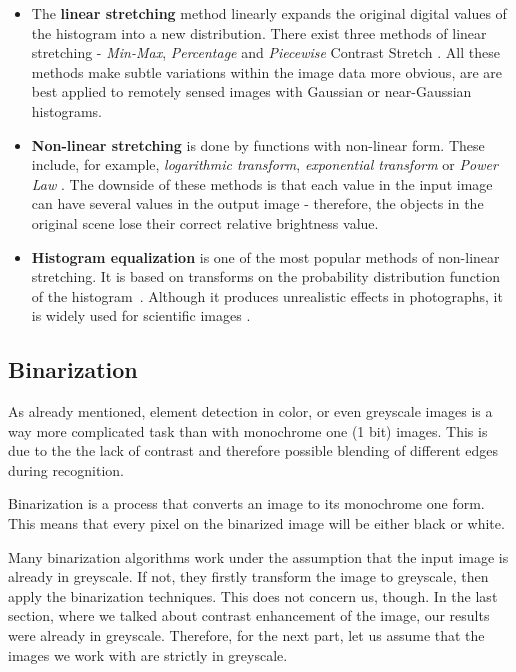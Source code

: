 \begin{itemize}

\item The \textbf{linear stretching} method linearly expands the original digital values of the histogram into a new distribution. There exist three methods of linear stretching - \emph{Min-Max}, \emph{Percentage} and \emph{Piecewise} Contrast Stretch \citet{linearNonStretch}. All these methods make subtle variations within the image data more obvious, are are best applied to remotely sensed images with Gaussian or near-Gaussian histograms.

\item\textbf{Non-linear stretching} is done by functions with non-linear form. These include, for example, \emph{logarithmic transform}, \emph{exponential transform} or \emph{Power Law} \citep{linearNonStretch}. The downside of these methods is that each value in the input image can have several values in the output image - therefore, the objects in the original scene lose their correct relative brightness value.

\item\textbf{Histogram equalization} is one of the most popular methods of non-linear stretching. It is based on transforms   on the probability distribution function of the histogram~\citep{histogramEQ}. Although it produces unrealistic effects in photographs, it is widely used for scientific images .

\end{itemize}

\subsection{Binarization}

As already mentioned, element detection in color, or even greyscale images is a way more complicated task than with monochrome one (1 bit) images. This is due to the the lack of contrast and therefore possible blending of different edges during recognition.

Binarization is a process that converts an image to its monochrome one form. This means that every pixel on the binarized image will be either black or white.

Many binarization algorithms work under the assumption that the input image is already in greyscale. If not, they firstly transform the image to greyscale, then apply the binarization techniques. This does not concern us, though. In the last section, where we talked about contrast enhancement of the image, our results were already in greyscale. Therefore, for the next part, let us assume that the images we work with are strictly in greyscale.

